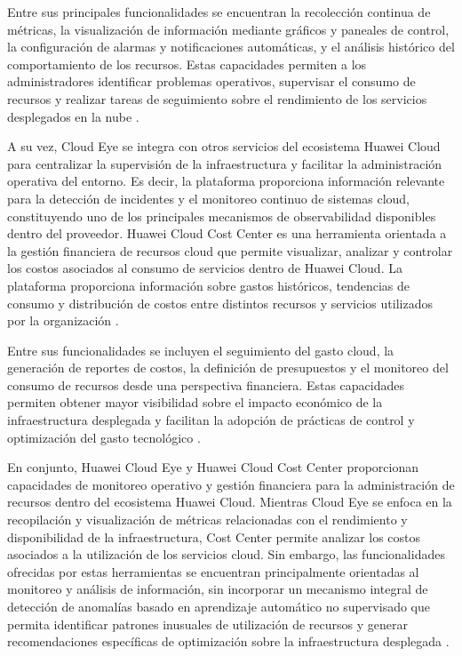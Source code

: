 Entre sus principales funcionalidades se encuentran la recolección continua de métricas, la visualización de información mediante gráficos y paneales de control, la configuración de alarmas y notificaciones automáticas, y el análisis histórico del comportamiento de los recursos. Estas capacidades permiten a los administradores identificar problemas operativos, supervisar el consumo de recursos y realizar tareas de seguimiento sobre el rendimiento de los servicios desplegados en la nube \parencite{HuaweiCloud2026}.

A su vez, Cloud Eye se integra con otros servicios del ecosistema Huawei Cloud para centralizar la supervisión de la infraestructura y facilitar la administración operativa del entorno. Es decir, la plataforma proporciona información relevante para la detección de incidentes y el monitoreo continuo de sistemas cloud, constituyendo uno de los principales mecanismos de observabilidad disponibles dentro del proveedor. Huawei Cloud Cost Center es una herramienta orientada a la gestión financiera de recursos cloud que permite visualizar, analizar y controlar los costos asociados al consumo de servicios dentro de Huawei Cloud. La plataforma proporciona información sobre gastos históricos, tendencias de consumo y distribución de costos entre distintos recursos y servicios utilizados por la organización \parencite{HuaweiCloud2026}.

Entre sus funcionalidades se incluyen el seguimiento del gasto cloud, la generación de reportes de costos, la definición de presupuestos y el monitoreo del consumo de recursos desde una perspectiva financiera. Estas capacidades permiten obtener mayor visibilidad sobre el impacto económico de la infraestructura desplegada y facilitan la adopción de prácticas de control y optimización del gasto tecnológico \parencite{HuaweiCloud2026}.

En conjunto, Huawei Cloud Eye y Huawei Cloud Cost Center proporcionan capacidades de monitoreo operativo y gestión financiera para la administración de recursos dentro del ecosistema Huawei Cloud. Mientras Cloud Eye se enfoca en la recopilación y visualización de métricas relacionadas con el rendimiento y disponibilidad de la infraestructura, Cost Center permite analizar los costos asociados a la utilización de los servicios cloud. Sin embargo, las funcionalidades ofrecidas por estas herramientas se encuentran principalmente orientadas al monitoreo y análisis de información, sin incorporar un mecanismo integral de detección de anomalías basado en aprendizaje automático no supervisado que permita identificar patrones inusuales de utilización de recursos y generar recomendaciones específicas de optimización sobre la infraestructura desplegada \parencite{HuaweiCloud2026}.

